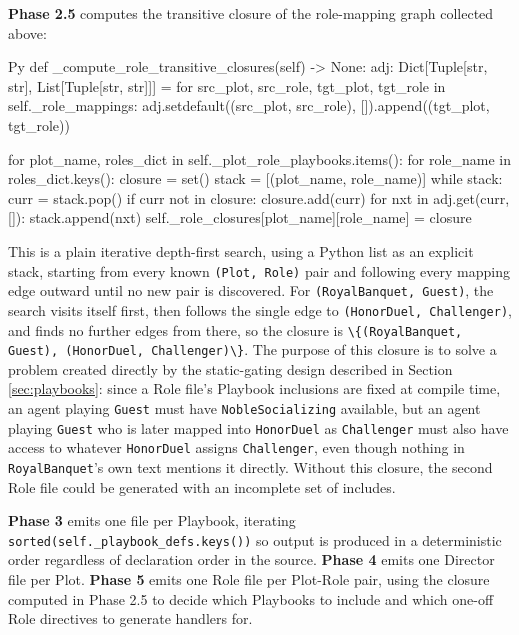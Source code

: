 \textbf{Phase 2.5} computes the transitive closure of the role-mapping graph collected above:
\begin{codeblock}[]{Py}
def _compute_role_transitive_closures(self) -> None:
    adj: Dict[Tuple[str, str], List[Tuple[str, str]]] = {}
    for src_plot, src_role, tgt_plot, tgt_role in self._role_mappings:
        adj.setdefault((src_plot, src_role), []).append((tgt_plot, tgt_role))

    for plot_name, roles_dict in self._plot_role_playbooks.items():
        for role_name in roles_dict.keys():
            closure = set()
            stack = [(plot_name, role_name)]
            while stack:
                curr = stack.pop()
                if curr not in closure:
                    closure.add(curr)
                    for nxt in adj.get(curr, []):
                        stack.append(nxt)
            self._role_closures[plot_name][role_name] = closure
\end{codeblock}
This is a plain iterative depth-first search, using a Python list as an explicit stack, starting from every known \lstinline|(Plot, Role)| pair and following every mapping edge outward until no new pair is discovered. For \lstinline|(RoyalBanquet, Guest)|, the search visits itself first, then follows the single edge to \lstinline|(HonorDuel, Challenger)|, and finds no further edges from there, so the closure is \lstinline|\{(RoyalBanquet, Guest), (HonorDuel, Challenger)\}|. The purpose of this closure is to solve a problem created directly by the static-gating design described in Section \ref{sec:playbooks}: since a Role file's Playbook inclusions are fixed at compile time, an agent playing \lstinline|Guest| must have \lstinline|NobleSocializing| available, but an agent playing \lstinline|Guest| who is later mapped into \lstinline|HonorDuel| as \lstinline|Challenger| must also have access to whatever \lstinline|HonorDuel| assigns \lstinline|Challenger|, even though nothing in \lstinline|RoyalBanquet|'s own text mentions it directly. Without this closure, the second Role file could be generated with an incomplete set of includes.

\textbf{Phase 3} emits one file per Playbook, iterating \lstinline|sorted(self._playbook_defs.keys())| so output is produced in a deterministic order regardless of declaration order in the source. \textbf{Phase 4} emits one Director file per Plot. \textbf{Phase 5} emits one Role file per Plot-Role pair, using the closure computed in Phase 2.5 to decide which Playbooks to include and which one-off Role directives to generate handlers for.

